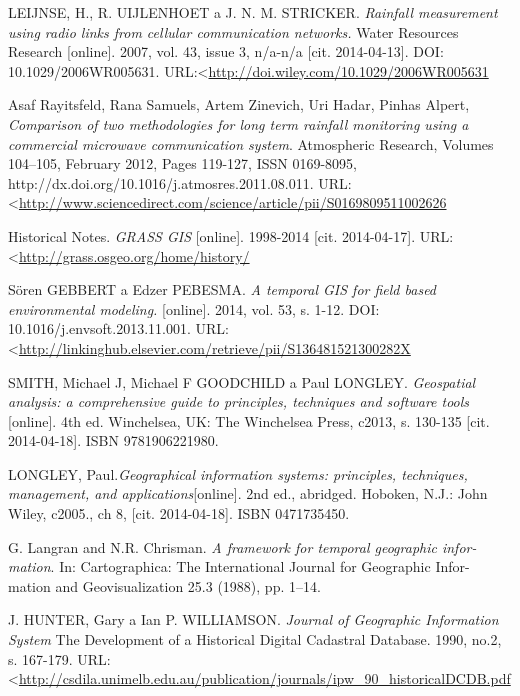 \documentclass[a4paper,12pt,oneside]{report}
\begin{document}
\begin{thebibliography}{99}
LEIJNSE, H., R. UIJLENHOET a J. N. M. STRICKER. \textit{Rainfall measurement using radio links from cellular communication networks.} Water Resources Research [online]. 2007, vol. 43, issue 3, n/a-n/a [cit. 2014-04-13]. DOI: 10.1029/2006WR005631. URL:\textless\url {http://doi.wiley.com/10.1029/2006WR005631}

Asaf Rayitsfeld, Rana Samuels, Artem Zinevich, Uri Hadar, Pinhas Alpert, \textit{Comparison of two methodologies for long term rainfall monitoring using a commercial microwave communication system}. Atmospheric Research, Volumes 104–105, February 2012, Pages 119-127, ISSN 0169-8095, http://dx.doi.org/10.1016/j.atmosres.2011.08.011.
URL:\textless\url {http://www.sciencedirect.com/science/article/pii/S0169809511002626}

Historical Notes. \textit{GRASS GIS} [online]. 1998-2014 [cit. 2014-04-17]. URL:\textless\url {http://grass.osgeo.org/home/history/}



Sören GEBBERT a Edzer PEBESMA. \textit{A temporal GIS for field based environmental modeling.} [online]. 2014, vol. 53, s. 1-12. DOI: 10.1016/j.envsoft.2013.11.001. URL:\textless\url {http://linkinghub.elsevier.com/retrieve/pii/S136481521300282X}




SMITH, Michael J, Michael F GOODCHILD a Paul LONGLEY. \textit{Geospatial analysis: a comprehensive guide to principles, techniques and software tools} [online]. 4th ed. Winchelsea, UK: The Winchelsea Press, c2013, s. 130-135 [cit. 2014-04-18]. ISBN 9781906221980.

LONGLEY, Paul.\textit{Geographical information systems: principles, techniques, management, and applications}[online]. 2nd ed., abridged. Hoboken, N.J.: John Wiley, c2005., ch 8, [cit. 2014-04-18]. ISBN 0471735450.

G. Langran and N.R. Chrisman. \textit{A framework for temporal geographic infor-
mation}. In: Cartographica: The International Journal for Geographic Infor-
mation and Geovisualization 25.3 (1988), pp. 1–14.

J. HUNTER, Gary a Ian P. WILLIAMSON. \textit{Journal of Geographic Information System} The Development of a Historical Digital Cadastral Database. 1990, no.2, s. 167-179. URL:\textless\url {http://csdila.unimelb.edu.au/publication/journals/ipw_90_historicalDCDB.pdf}



\end{thebibliography}
\end{document}

